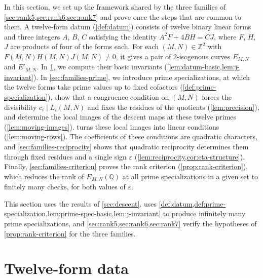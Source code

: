 \documentclass[12pt,oneside,openany]{book}
\theoremstyle{definition}
\theoremstyle{plain}
\numberwithin{equation}{chapter}
\theoremstyle{plain}
\theoremstyle{definition}
\theoremstyle{remark}
\newcommand{\Q}{\mathbb Q}
\newcommand{\Z}{\mathbb Z}
\newcommand{\eps}{\varepsilon}
\begin{document}
In this section, we set up the framework shared by the three families of \cref{sec:rank5,sec:rank6,sec:rank7} and prove once the steps that are common to them. A twelve-form datum (\cref{def:datum}) consists of twelve binary linear forms and three integers $A$, $B$, $C$ satisfying the identity $A^2F+4BH=CJ$, where $F$, $H$, $J$ are products of four of the forms each. For each $(M,N)\in\Z^2$ with $F(M,N)H(M,N)J(M,N)\ne0$, it gives a pair of $2$-isogenous curves $E_{M,N}$ and $E'_{M,N}$. In \cref{sec:families-data}, we compute their basic invariants (\cref{lem:datum-basic,lem:j-invariant}). In \cref{sec:families-prime}, we introduce prime specializations, at which the twelve forms take prime values up to fixed cofactors (\cref{def:prime-specialization}), show that a congruence condition on $(M,N)$ forces the divisibility $c_i\mid L_i(M,N)$ and fixes the residues of the quotients (\cref{lem:precision}), and determine the local images of the descent maps at these twelve primes (\cref{lem:moving-images}).  turns these local images into linear conditions (\cref{lem:moving-rows}). The coefficients of these conditions are quadratic characters, and \cref{sec:families-reciprocity} shows that quadratic reciprocity determines them through fixed residues and a single sign $\eps$ (\cref{lem:reciprocity,cor:eta-structure}). Finally, \cref{sec:families-criterion} proves the rank criterion (\cref{prop:rank-criterion}), which reduces the rank of $E_{M,N}(\Q)$ at all prime specializations in a given set to finitely many checks, for both values of $\eps$.

This section uses the results of \cref{sec:descent}.  uses \cref{def:datum,def:prime-specialization,lem:prime-spec-basic,lem:j-invariant} to produce infinitely many prime specializations, and \cref{sec:rank5,sec:rank6,sec:rank7} verify the hypotheses of \cref{prop:rank-criterion} for the three families.

\section{Twelve-form data}\label{sec:families-data}
\end{document}

